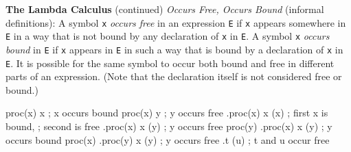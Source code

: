 \begin{minipage}[t]{\sw}
\slidenumber
\LARGE
{\bf The Lambda Calculus} (continued)\exx
{\em Occurs Free, Occurs Bound} (informal definitions):\exx
A symbol \verb'x' {\em occurs free} in an expression \verb'E'
if \verb'x' appears somewhere in \verb'E'
in a way that is not bound by any declaration of \verb'x' in \verb'E'.
A symbol \verb'x' {\em occurs bound} in \verb'E'
if \verb'x' appears in \verb'E' in such a way
that is bound by a declaration of \verb'x' in \verb'E'.
It is possible for the same symbol to occur both bound and free
in different parts of an expression.
(Note that the declaration itself is not considered
free or bound.)
\begin{qv}
proc(x) {x}                ; x occurs bound
proc(x) {y}                ; y occurs free
.proc(x) {x} (x)           ; first x is bound,
                           ; second is free
.proc(x) {x} (y)           ; y occurs free
proc(y) {.proc(x) {x} (y)} ; y occurs bound
proc(x) {.proc(y) {x} (y)} ; y occurs free
.t (u)                     ; t and u occur free
\end{qv}

\end{minipage}
\clearpage
